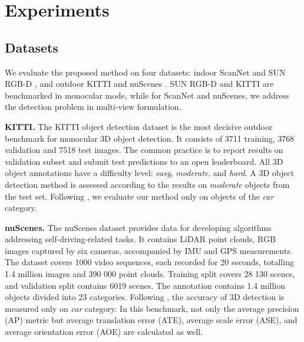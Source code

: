 \documentclass[10pt,twocolumn,letterpaper]{article}
\begin{document}
\section{Experiments}

\subsection{Datasets}

We evaluate the proposed method on four datasets: indoor ScanNet \cite{dai2017scannet} and SUN RGB-D \cite{song2015sunrgbd}, and outdoor KITTI \cite{geiger2012kitti} and nuScenes \cite{caesar2020nuscenes}. SUN RGB-D and KITTI are benchmarked in monocular mode, while for ScanNet and nuScenes, we address the detection problem in multi-view formulation.

\textbf{KITTI.} The KITTI object detection dataset \cite{geiger2012kitti} is the most decisive outdoor benchmark for monocular 3D object detection. It consists of 3711 training, 3768 validation and 7518 test images. The common practice \cite{simonelli2020disentangling, liu2020smoke} is to report results on validation subset and submit test predictions to an open leaderboard. All 3D object annotations have a difficulty level: \textit{easy}, \textit{moderate}, and \textit{hard}. A 3D object detection method is assessed according to the results on \textit{moderate} objects from the test set. Following \cite{simonelli2020disentangling, liu2020smoke}, we evaluate our method only on objects of the \textit{car} category.

\textbf{nuScenes.} The nuScenes dataset \cite{caesar2020nuscenes} provides data for developing algorithms addressing self-driving-related tasks. It contains LiDAR point clouds, RGB images captured by six cameras, accompanied by IMU and GPS measurements. The dataset covers 1000 video sequences, each recorded for 20 seconds, totalling 1.4 million images and 390 000 point clouds. Training split covers 28 130 scenes, and validation split contains 6019 scenes. The annotation contains 1.4 million objects divided into 23 categories. Following \cite{simonelli2020disentangling}, the accuracy of 3D detection is measured only on \textit{car} category. In this benchmark, not only the average precision (AP) metric but average translation error (ATE), average scale error (ASE), and average orientation error (AOE) are calculated as well.
\end{document}
